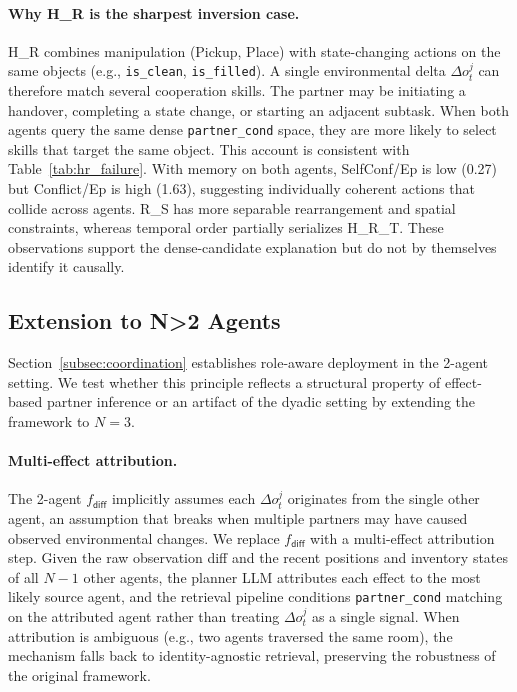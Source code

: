 \documentclass{article}
\theoremstyle{plain}
\theoremstyle{definition}
\theoremstyle{remark}
\begin{document}
\paragraph{Why H\_R is the sharpest inversion case.} H\_R combines manipulation (Pickup, Place) with state-changing actions on the same objects (e.g., \texttt{is\_clean}, \texttt{is\_filled}). A single environmental delta $\Delta o_t^j$ can therefore match several cooperation skills. The partner may be initiating a handover, completing a state change, or starting an adjacent subtask. When both agents query the same dense \texttt{partner\_cond} space, they are more likely to select skills that target the same object. This account is consistent with Table~\ref{tab:hr_failure}. With memory on both agents, SelfConf/Ep is low (0.27) but Conflict/Ep is high (1.63), suggesting individually coherent actions that collide across agents. R\_S has more separable rearrangement and spatial constraints, whereas temporal order partially serializes H\_R\_T. These observations support the dense-candidate explanation but do not by themselves identify it causally.

\subsection{Extension to N>2 Agents}
\label{sec:n_agent_extension}

Section~\ref{subsec:coordination} establishes role-aware deployment in the 2-agent setting. We test whether this principle reflects a structural property of effect-based partner inference or an artifact of the dyadic setting by extending the framework to $N{=}3$.

\paragraph{Multi-effect attribution.} The 2-agent $f_{\mathsf{diff}}$ implicitly assumes each $\Delta o_t^j$ originates from the single other agent, an assumption that breaks when multiple partners may have caused observed environmental changes. We replace $f_{\mathsf{diff}}$ with a multi-effect attribution step. Given the raw observation diff and the recent positions and inventory states of all $N{-}1$ other agents, the planner LLM attributes each effect to the most likely source agent, and the retrieval pipeline conditions \texttt{partner\_cond} matching on the attributed agent rather than treating $\Delta o_t^j$ as a single signal. When attribution is ambiguous (e.g., two agents traversed the same room), the mechanism falls back to identity-agnostic retrieval, preserving the robustness of the original framework.
\end{document}
